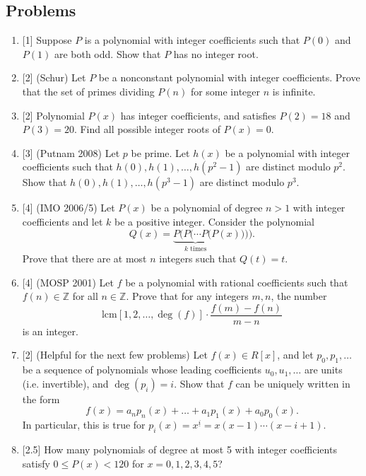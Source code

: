 \subsection{Problems}
\begin{enumerate}
\item{} [1] Suppose $P$ is a polynomial with integer coefficients such that $P(0)$ and $P(1)$ are both odd. Show that $P$ has no integer root.

\item{} [2] (Schur) Let $P$ be a nonconstant polynomial with integer coefficients. Prove that the set of primes dividing $P(n)$ for some integer $n$ is infinite.

\item{} [2] Polynomial $P(x)$ has integer coefficients, and satisfies $P(2)=18$ and $P(3)=20$. Find all possible integer roots of $P(x)=0$.

\item{} [3] (Putnam 2008) Let $p$ be prime. Let $h(x)$ be a polynomial with integer coefficients such that $h(0),h(1),\ldots, h(p^2-1)$ are distinct modulo $p^2$. Show that $h(0),h(1),\ldots, h(p^3-1)$ are distinct modulo $p^3$.

\item{}[4] (IMO 2006/5) Let $P(x)$ be a polynomial of degree $n>1$ with integer coefficients and let $k$ be a positive integer. Consider the polynomial
\[Q(x)=\underbrace{P(P(\cdots P(P}_{k\text{ times}}(x)))).\]
Prove that there are at most $n$ integers such that $Q(t)=t$.

\item{}[4] (MOSP 2001) Let $f$ be a polynomial with rational coefficients such that $f(n)\in \mathbb{Z}$ for all $n\in \mathbb{Z}$. Prove that for any integers $m,n$, the number
\[\text{lcm}[1,2,\ldots, \deg(f)]\cdot \frac{f(m)-f(n)}{m-n}\]
is an integer.

\item{}[2] (Helpful for the next few problems) 
Let $f(x)\in R[x]$, and let $p_0,p_1,\ldots$ be a sequence of  polynomials whose leading coefficients $u_0,u_1,\ldots $ are units (i.e. invertible), and $\deg(p_i)=i$. Show that $f$ can be uniquely written in the form
\[f(x)=a_np_n(x)+\ldots +a_1p_1(x)+a_0p_0(x).\]
In particular, this is true for $p_i(x)=x^{\underline{i}}=x(x-1)\cdots (x-i+1)$.

\item{}[2.5] How many polynomials of degree at most 5 with integer coefficients satisfy $0\leq P(x)<120$ for $x=0,1,2,3,4,5$?


\end{enumerate}
